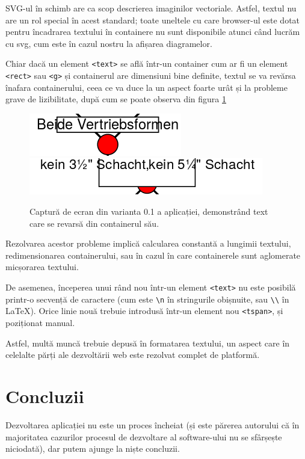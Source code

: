 \documentclass[12pt, a4paper, twoside, romanian]{teza-upb}
\begin{document}
        SVG-ul în schimb are ca scop descrierea imaginilor vectoriale. Astfel, textul nu are un rol special în acest standard; toate uneltele cu care browser-ul este dotat pentru încadrarea textului în containere nu sunt disponibile atunci când lucrăm cu svg, cum este în cazul nostru la afișarea diagramelor.

        Chiar dacă un element \verb=<text>= se află într-un container cum ar fi un element \verb=<rect>= sau \verb=<g>= și containerul are dimensiuni bine definite, textul se va revărsa înafara containerului, ceea ce va duce la un aspect foarte urât și la probleme grave de lizibilitate, după cum se poate observa din figura \ref{screenshot:svg-overflow}

        \begin{figure}[h]
            \includegraphics[width=.5\textwidth, natwidth=252, natheight=70]{svg-overflow.png}
            \includegraphics[width=.5\textwidth, natwidth=387, natheight=60]{svg-overflow-2.png}
            \caption{Captură de ecran din varianta 0.1 a aplicației, demonstrând text care se revarsă din containerul său.}
            \label{screenshot:svg-overflow}
          \end{figure}

        Rezolvarea acestor probleme implică calcularea constantă a lungimii textului, redimensionarea containerului, sau în cazul în care containerele sunt aglomerate micșorarea textului.

        De asemenea, începerea unui rând nou într-un element \verb=<text>= nu este posibilă printr-o secvență de caractere (cum este \verb=\n= în stringurile obișnuite, sau \verb=\\= în \LaTeX). Orice linie nouă trebuie introdusă într-un element nou \verb=<tspan>=, și poziționat manual.

        Astfel, multă muncă trebuie depusă în formatarea textului, un aspect care în celelalte părți ale dezvoltării web este rezolvat complet de platformă.


  \chapter*{Concluzii}
    Dezvoltarea aplicației nu este un proces încheiat (și este părerea autorului că în majoritatea cazurilor procesul de dezvoltare al software-ului nu se sfârșește niciodată), dar putem ajunge la niște concluzii. 
\end{document}
